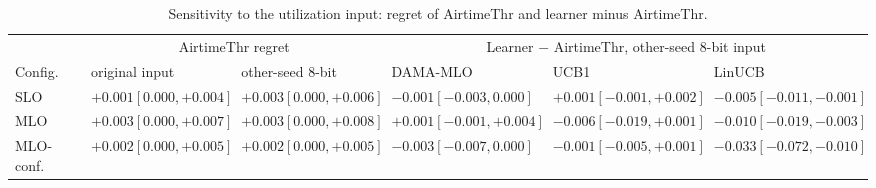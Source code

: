 \begin{table}[t]
\caption{Sensitivity to the utilization input: regret of AirtimeThr and learner minus AirtimeThr.}
\label{tab:inputsens}
\centering
\footnotesize
\setlength{\tabcolsep}{2.5pt}
\begin{tabular}{llllll}
\toprule
 & \multicolumn{2}{c}{AirtimeThr regret} & \multicolumn{3}{c}{Learner $-$ AirtimeThr, other-seed 8-bit input} \\
Config. & original input & other-seed 8-bit & DAMA-MLO & UCB1 & LinUCB \\
\midrule
SLO & $+0.001 [0.000, +0.004]$ & $+0.003 [0.000, +0.006]$ & $-0.001 [-0.003, 0.000]$ & $+0.001 [-0.001, +0.002]$ & $-0.005 [-0.011, -0.001]$ \\
MLO & $+0.003 [0.000, +0.007]$ & $+0.003 [0.000, +0.008]$ & $+0.001 [-0.001, +0.004]$ & $-0.006 [-0.019, +0.001]$ & $-0.010 [-0.019, -0.003]$ \\
MLO-conf. & $+0.002 [0.000, +0.005]$ & $+0.002 [0.000, +0.005]$ & $-0.003 [-0.007, 0.000]$ & $-0.001 [-0.005, +0.001]$ & $-0.033 [-0.072, -0.010]$ \\
\bottomrule
\end{tabular}
\end{table}
